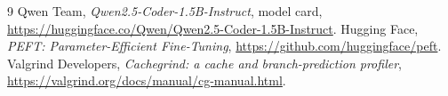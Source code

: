 \documentclass[11pt]{article}
\begin{document}
\begin{thebibliography}{9}
Qwen Team, \emph{Qwen2.5-Coder-1.5B-Instruct}, model card,
\url{https://huggingface.co/Qwen/Qwen2.5-Coder-1.5B-Instruct}.
Hugging Face, \emph{PEFT: Parameter-Efficient Fine-Tuning},
\url{https://github.com/huggingface/peft}.
Valgrind Developers, \emph{Cachegrind: a cache and branch-prediction profiler},
\url{https://valgrind.org/docs/manual/cg-manual.html}.
\end{thebibliography}
\end{document}
